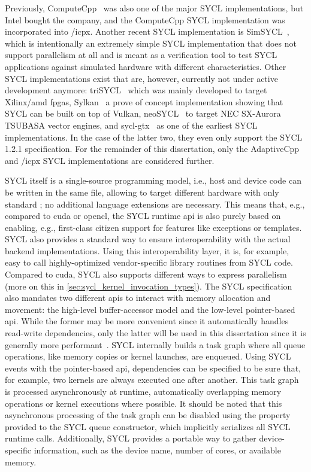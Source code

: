 Previously, ComputeCpp~\cite{misra_development_2019} was also one of the major SYCL implementations, but Intel bought the company, and the ComputeCpp SYCL implementation was incorporated into \dpcpp/icpx. 
Another recent SYCL implementation is SimSYCL~\cite{thoman_simsycl_2024}, which is intentionally an extremely simple SYCL implementation that does not support parallelism at all and is meant as a verification tool to test SYCL applications against simulated hardware with different characteristics.  
Other SYCL implementations exist that are, however, currently not under active development anymore: triSYCL~\cite{gozillon_trisycl_2020, doumoulakis_sycl_2017} which was mainly developed to target Xilinx/\gls{amd} \glspl{fpga}, Sylkan~\cite{thoman_sylkan_2021} a prove of concept implementation showing that SYCL can be built on top of Vulkan, neoSYCL~\cite{ke_neosycl_2021} to target NEC SX-Aurora TSUBASA vector engines, and sycl-gtx~\cite{zuzek_implementation_2016} as one of the earliest SYCL implementations. 
In the case of the latter two, they even only support the SYCL 1.2.1 specification. 
For the remainder of this dissertation, only the AdaptiveCpp and \dpcpp/icpx SYCL implementations are considered further. 

SYCL itself is a single-source programming model, i.e., host and device code can be written in the same file, allowing to target different hardware with only standard \cpp; no additional language extensions are necessary. 
This means that, e.g., compared to \gls{cuda} or \gls{opencl}, the SYCL runtime \gls{api} is also purely based on \cpp enabling, e.g., first-class citizen support for \cpp features like exceptions or templates. 
SYCL also provides a standard way to ensure interoperability with the actual backend implementations. 
Using this interoperability layer, it is, for example, easy to call highly-optimized vendor-specific library routines from SYCL code. 
Compared to \gls{cuda}, SYCL also supports different ways to express parallelism (more on this in \autoref{sec:sycl_kernel_invocation_types}). 
The SYCL specification also mandates two different \glspl{api} to interact with memory allocation and movement: the high-level buffer-accessor model and the low-level pointer-based \gls{api}. 
While the former may be more convenient since it automatically handles read-write dependencies, only the latter will be used in this dissertation since it is generally more performant~\cite{crisci_sycl-bench_2024}. 
SYCL internally builds a task graph where all queue operations, like memory copies or kernel launches, are enqueued. 
Using SYCL events with the pointer-based \gls{api}, dependencies can be specified to be sure that, for example, two kernels are always executed one after another. 
This task graph is processed asynchronously at runtime, automatically overlapping memory operations or kernel executions where possible. 
It should be noted that this asynchronous processing of the task graph can be disabled using the  property provided to the SYCL queue constructor, which implicitly serializes all SYCL runtime calls.
Additionally, SYCL provides a portable way to gather device-specific information, such as the device name, number of cores, or available memory. 

